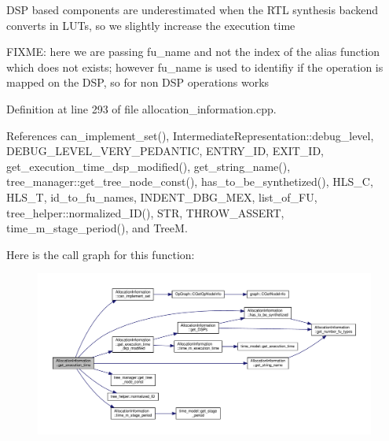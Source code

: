 D\+SP based components are underestimated when the R\+TL synthesis backend converts in L\+U\+Ts, so we slightly increase the execution time

F\+I\+X\+ME\+: here we are passing fu\+\_\+name and not the index of the alias function which does not exists; however fu\+\_\+name is used to identifiy if the operation is mapped on the D\+SP, so for non D\+SP operations works 

Definition at line 293 of file allocation\+\_\+information.\+cpp.



References can\+\_\+implement\+\_\+set(), Intermediate\+Representation\+::debug\+\_\+level, D\+E\+B\+U\+G\+\_\+\+L\+E\+V\+E\+L\+\_\+\+V\+E\+R\+Y\+\_\+\+P\+E\+D\+A\+N\+T\+IC, E\+N\+T\+R\+Y\+\_\+\+ID, E\+X\+I\+T\+\_\+\+ID, get\+\_\+execution\+\_\+time\+\_\+dsp\+\_\+modified(), get\+\_\+string\+\_\+name(), tree\+\_\+manager\+::get\+\_\+tree\+\_\+node\+\_\+const(), has\+\_\+to\+\_\+be\+\_\+synthetized(), H\+L\+S\+\_\+C, H\+L\+S\+\_\+T, id\+\_\+to\+\_\+fu\+\_\+names, I\+N\+D\+E\+N\+T\+\_\+\+D\+B\+G\+\_\+\+M\+EX, list\+\_\+of\+\_\+\+FU, tree\+\_\+helper\+::normalized\+\_\+\+I\+D(), S\+TR, T\+H\+R\+O\+W\+\_\+\+A\+S\+S\+E\+RT, time\+\_\+m\+\_\+stage\+\_\+period(), and TreeM.

Here is the call graph for this function\+:
\nopagebreak
\begin{figure}[H]
\begin{center}
\leavevmode
\includegraphics[width=350pt]{d7/d79/classAllocationInformation_aa0baee2e03b9245d2ec159e64fd5b926_cgraph}
\end{center}
\end{figure}
\mbox{\label{classAllocationInformation_a242d6db211604c5f03c4bbe79190086b}} 
